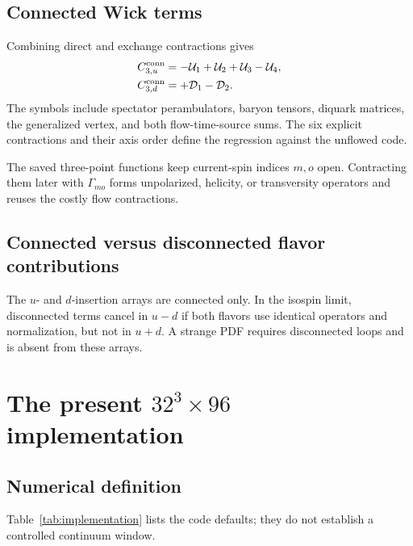 \documentclass[11pt]{article}
\numberwithin{equation}{section}
\begin{document}
\subsection{Connected Wick terms}

Combining direct and exchange contractions gives
\begin{align}
  C_{3,u}^{\rm conn}
  &=-\mathcal U_1+\mathcal U_2+\mathcal U_3-\mathcal U_4,
  \\
  C_{3,d}^{\rm conn}
  &=+\mathcal D_1-\mathcal D_2.
  \label{eq:wick-signs}
\end{align}
The symbols include spectator perambulators, baryon tensors, diquark matrices,
the generalized vertex, and both flow-time-source sums. The six explicit
contractions and their axis order define the regression against the unflowed
code.

The saved three-point functions keep current-spin indices \(m,o\) open.
Contracting them later with \(\Gamma_{mo}\) forms unpolarized, helicity, or
transversity operators and reuses the costly flow contractions.

\subsection{Connected versus disconnected flavor contributions}

The \(u\)- and \(d\)-insertion arrays are connected only. In the isospin
limit, disconnected terms cancel in \(u-d\) if both flavors use identical
operators and normalization, but not in \(u+d\). A strange PDF requires
disconnected loops and is absent from these arrays.

\section{The present \texorpdfstring{\(32^3\times96\)}{32x96} implementation}

\subsection{Numerical definition}

Table~\ref{tab:implementation} lists the code defaults; they do not establish
a controlled continuum window.
\end{document}
